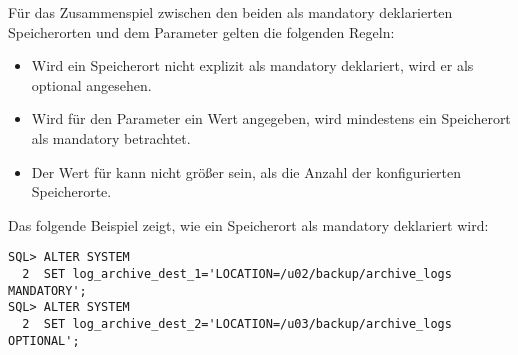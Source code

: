           F\"ur das Zusammenspiel zwischen den beiden als mandatory deklarierten Speicherorten und dem Parameter  gelten die folgenden Regeln:
          \begin{itemize}
            \item Wird ein Speicherort nicht explizit als mandatory deklariert, wird er als optional angesehen.
            \item Wird f\"ur den Parameter  ein Wert angegeben, wird mindestens ein Speicherort als mandatory betrachtet.
            \item Der Wert f\"ur  kann nicht gr\"o\ss er sein, als die Anzahl der konfigurierten Speicherorte.
          \end{itemize}
          Das folgende Beispiel zeigt, wie ein Speicherort als mandatory deklariert wird:
          \begin{lstlisting}[caption={\parameter{log\_archive\_dest\_n} als mandatory deklarieren},label=admin51,language=oracle_sql]
SQL> ALTER SYSTEM
  2  SET log_archive_dest_1='LOCATION=/u02/backup/archive_logs MANDATORY';
SQL> ALTER SYSTEM
  2  SET log_archive_dest_2='LOCATION=/u03/backup/archive_logs OPTIONAL';
          \end{lstlisting}
